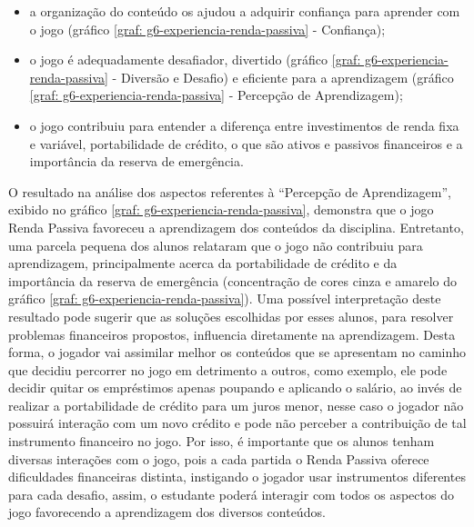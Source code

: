 \begin{itemize}
    \item a organização do conteúdo os ajudou a adquirir confiança para aprender com o jogo (gráfico \ref{graf: g6-experiencia-renda-passiva} - Confiança);

    \item o jogo é adequadamente desafiador, divertido (gráfico \ref{graf: g6-experiencia-renda-passiva} - Diversão e Desafio) e eficiente para a aprendizagem (gráfico \ref{graf: g6-experiencia-renda-passiva} - Percepção de Aprendizagem);

    \item o jogo contribuiu para entender a diferença entre investimentos de renda fixa e variável, portabilidade de crédito, o que são ativos e passivos financeiros e a importância da reserva de emergência.
\end{itemize}

O resultado na análise dos aspectos referentes à “Percepção de Aprendizagem”, exibido no gráfico \ref{graf: g6-experiencia-renda-passiva}, demonstra que o jogo Renda Passiva favoreceu a aprendizagem dos conteúdos da disciplina. Entretanto, uma parcela pequena dos alunos relataram que o jogo não contribuiu para aprendizagem, principalmente acerca da portabilidade de crédito e da importância da reserva de emergência (concentração de cores cinza e amarelo do gráfico \ref{graf: g6-experiencia-renda-passiva}). Uma possível interpretação deste resultado pode sugerir que as soluções escolhidas por esses alunos, para resolver problemas financeiros propostos, influencia diretamente na aprendizagem. Desta forma, o jogador vai assimilar melhor os conteúdos que se apresentam no caminho que decidiu percorrer no jogo em detrimento a outros, como exemplo, ele pode decidir quitar os empréstimos apenas poupando e aplicando o salário, ao invés de realizar a portabilidade de crédito para um juros menor, nesse caso o jogador não possuirá interação com um novo crédito e pode não perceber a contribuição de tal instrumento financeiro no jogo. Por isso, é importante que os alunos tenham diversas interações com o jogo, pois a cada partida o Renda Passiva oferece dificuldades financeiras distinta, instigando o jogador usar instrumentos diferentes para cada desafio, assim, o estudante poderá interagir com todos os aspectos do jogo favorecendo a aprendizagem dos diversos conteúdos.

